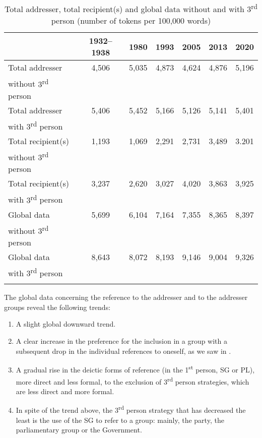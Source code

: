 \documentclass[output=paper]{langscibook}
\begin{document}
\begin{table}[p]
\small
\begin{tabular}{lcccccc} 
\lsptoprule
& {{1932–1938}} & {{1980}} & {{1993}} & {{2005}} & {{2013}} & {2020}\\
\midrule
{{Total} {addresser}} & {4,506} & {5,035} & {4,873} & {4,624} & {4,876} & {5,196}\\
{without} {3\textsuperscript{rd}} {person}\\
\midrule
{{Total} {addresser}} & {5,406} & {5,452} & {5,166} & {5,126} & {5,141} & {5,401}\\
{with} {3\textsuperscript{rd}} {person}\\
\midrule
{{Total} {recipient(s)}} & {1,193} & {1,069} & {2,291} & {2,731} & {3,489} & {3.201}\\
{without} {3\textsuperscript{rd}} {person}\\
\midrule
{{Total} {recipient(s)}} & {3,237} & {2,620} & {3,027} & {4,020} & {3,863} & {3,925}\\
{with} {3\textsuperscript{rd}} {person}\\
\midrule
{{Global} {data}} & {5,699} & {6,104} & {7,164} & {7,355} & {8,365} & {8,397}\\
{without} {3\textsuperscript{rd}} {person}\\
\midrule
{{Global} {data}} & {8,643} & {8,072} & {8,193} & {9,146} & {9,004} & {9,326}\\
{with} {3\textsuperscript{rd}} {person}\\
\lspbottomrule
\end{tabular}
\caption{Total addresser, total recipient(s) and global data without and with 3\textsuperscript{rd} person (number of tokens per 100,000 words)}
\label{tab:nogue:19}
\end{table}
\clearpage


The global data concerning the reference to the addresser and to the addresser groups reveal the following trends:


\begin{enumerate}
\item A slight global downward trend.

\item A clear increase in the preference for the inclusion in a group with a subsequent drop in the individual references to oneself, as we saw in .

\item A gradual rise in the deictic forms of reference (in the 1\textsuperscript{st} person, SG or PL), more direct and less formal, to the exclusion of 3\textsuperscript{rd} person strategies, which are less direct and more formal.

\item In spite of the trend above, the 3\textsuperscript{rd} person strategy that has decreased the least is the use of the SG to refer to a group: mainly, the party, the parliamentary group or the Government.
\end{enumerate}
\end{document}
